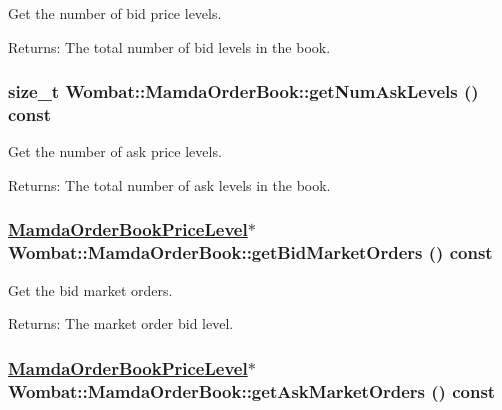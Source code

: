 Get the number of bid price levels. 

\begin{Desc}
\item[Returns:]The total number of bid levels in the book. \end{Desc}
\hypertarget{classWombat_1_1MamdaOrderBook_0badd234b16c9cd5450aa9d6075d0f29}{
\subsubsection[getNumAskLevels]{\setlength{\rightskip}{0pt plus 5cm}size\_\-t Wombat::Mamda\-Order\-Book::get\-Num\-Ask\-Levels () const}}
\label{classWombat_1_1MamdaOrderBook_0badd234b16c9cd5450aa9d6075d0f29}


Get the number of ask price levels. 

\begin{Desc}
\item[Returns:]The total number of ask levels in the book. \end{Desc}
\hypertarget{classWombat_1_1MamdaOrderBook_738ccfa6cee1c6c7aef52c8726433157}{
\subsubsection[getBidMarketOrders]{\setlength{\rightskip}{0pt plus 5cm}\hyperlink{classWombat_1_1MamdaOrderBookPriceLevel}{Mamda\-Order\-Book\-Price\-Level}$\ast$ Wombat::Mamda\-Order\-Book::get\-Bid\-Market\-Orders () const}}
\label{classWombat_1_1MamdaOrderBook_738ccfa6cee1c6c7aef52c8726433157}


Get the bid market orders. 

\begin{Desc}
\item[Returns:]The market order bid level. \end{Desc}
\hypertarget{classWombat_1_1MamdaOrderBook_29562e102bf76cde4eae4d13f74c88fd}{
\subsubsection[getAskMarketOrders]{\setlength{\rightskip}{0pt plus 5cm}\hyperlink{classWombat_1_1MamdaOrderBookPriceLevel}{Mamda\-Order\-Book\-Price\-Level}$\ast$ Wombat::Mamda\-Order\-Book::get\-Ask\-Market\-Orders () const}}
\label{classWombat_1_1MamdaOrderBook_29562e102bf76cde4eae4d13f74c88fd}


